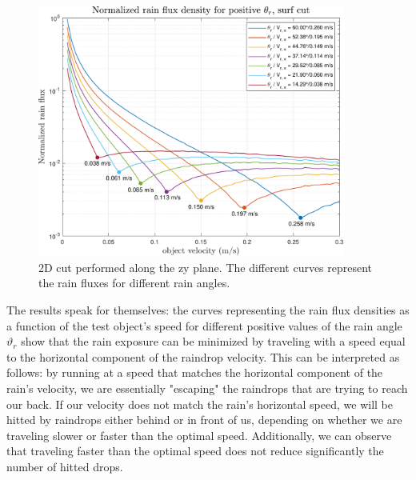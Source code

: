 \documentclass[12pt]{report}
\begin{document}
            \newpage
            \begin{figure}[H]
                \centering
                \includegraphics[width=0.9\textwidth]{images/human/rain_flux_vx_min.pdf}
                \caption{2D cut performed along the zy plane. The different curves represent the rain fluxes for different rain angles.}
            \end{figure}
            \vspace{-30pt}
            The results speak for themselves: the curves representing the rain flux densities as a function of the test object's speed for different positive values of the rain angle $\vartheta_r$ show that the rain exposure can be minimized by traveling with a speed equal to the horizontal component of the raindrop velocity. This can be interpreted as follows: by running at a speed that matches the horizontal component of the rain's velocity, we are essentially "escaping" the raindrops that are trying to reach our back. If our velocity does not match the rain's horizontal speed, we will be hitted by raindrops either behind or in front of us, depending on whether we are traveling slower or faster than the optimal speed. Additionally, we can observe that traveling faster than the optimal speed does not reduce significantly the number of hitted drops.

            \newpage
\end{document}

